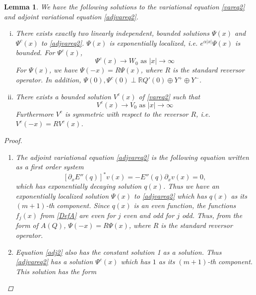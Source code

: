 \documentclass[12pt]{article}
\def\R{{\mathbb R}}
\newtheorem{lemma}{Lemma}
\begin{document}
\begin{lemma}\label{varadjsolutions}
We have the following solutions to the variational equation \eqref{vareq2} and adjoint variational equation \eqref{adjvareq2}.

\begin{enumerate}[(i)]

\item There exists exactly two linearly independent, bounded solutions $\Psi(x)$ and $\Psi^c(x)$ to \eqref{adjvareq2}. $\Psi(x)$ is exponentially localized, i.e. $e^{\alpha |x|}\Psi(x)$ is bounded. For $\Psi^c(x)$,
	\begin{equation}
	\Psi^c(x) \rightarrow W_0 \text{ as }|x| \rightarrow \infty
	\end{equation}
For $\Psi(x)$, we have $\Psi(-x) = R \Psi(x)$, where $R$ is the standard reversor operator. In addition, $\Psi(0), \Psi^c(0) \perp \R Q'(0) \oplus Y^+ \oplus Y^-$.

\item There exists a bounded solution $V^c(x)$ of \eqref{vareq2} such that 
\begin{equation}
V^c(x) \rightarrow V_0 \text{ as }|x| \rightarrow \infty
\end{equation}
Furthermore $V^c$ is symmetric with respect to the reversor $R$, i.e. $V^c(-x) = R V^c(x)$.
\end{enumerate}

\begin{proof}

\begin{enumerate}
\item The adjoint variational equation \eqref{adjvareq2} is the following equation written as a first order system
\begin{equation}\label{adj2}
[\partial_x E''(q) ]^* v(x) = -E''(q) \partial_x v(x) = 0,
\end{equation}
which has exponentially decaying solution $q(x)$. Thus we have an exponentially localized solution $\Psi(x)$ to \eqref{adjvareq2} which has $q(x)$ as its $(m+1)$-th component. Since $q(x)$ is an even function, the functions $f_j(x)$ from \eqref{DefA} are even for $j$ even and odd for $j$ odd. Thus, from the form of $A(Q)$, $\Psi(-x) = R \Psi(x)$, where $R$ is the standard reversor operator.

\item Equation \eqref{adj2} also has the constant solution 1 as a solution. Thus \eqref{adjvareq2} has a solution $\Psi^c(x)$ which has $1$ as its $(m+1)$-th component. This solution has the form


\end{enumerate}
\end{proof}
\end{lemma}
\end{document}
